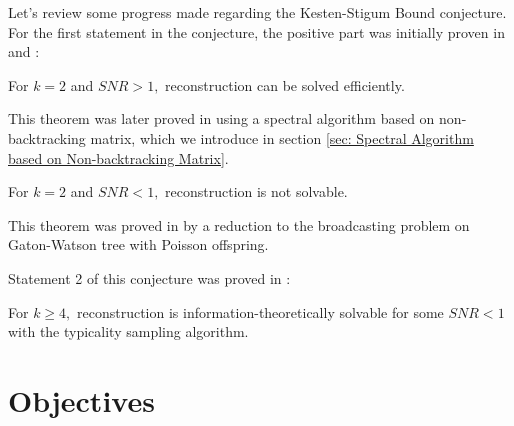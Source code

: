 Let's review some progress made regarding the Kesten-Stigum Bound conjecture. For the first statement in the conjecture, the positive part was initially proven in \cite{mas14} and \cite{mns14b}:
\begin{theorem}
    For $k=2$ and $SNR>1,$ reconstruction can be solved efficiently.
\end{theorem}
\begin{remark}
    This theorem was later proved in \cite{blm15} using a spectral algorithm based on non-backtracking matrix, which we introduce in section \ref{sec: Spectral Algorithm based on Non-backtracking Matrix}.
\end{remark}
\begin{theorem}
    For $k=2$ and $SNR<1,$ reconstruction is not solvable.
\end{theorem}
\begin{remark}
    This theorem was proved in \cite{mns15} by a reduction to the broadcasting problem on Gaton-Watson tree with Poisson offspring.
\end{remark}
Statement 2 of this conjecture was proved in \cite{as16a}:
\begin{theorem}
    For $k\geq4,$ reconstruction is information-theoretically solvable for some $SNR<1$ with the typicality sampling algorithm.
\end{theorem}
\clearpage
\section{Objectives}
